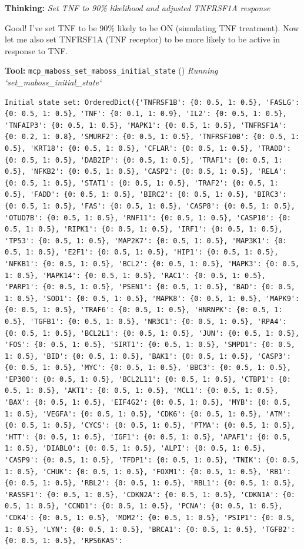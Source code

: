 \documentclass[11pt,a4paper]{article}
\begin{document}
\begin{thinkbox}
\textbf{Thinking:} \textit{Set TNF to 90\% likelihood and adjusted TNFRSF1A response}

Good! I've set TNF to be 90\% likely to be ON (simulating TNF treatment). Now let me also set TNFRSF1A (TNF receptor) to be more likely to be active in response to TNF.

\end{thinkbox}
\begin{toolokbox}
\textbf{Tool:} \texttt{mcp\_maboss\_set\_maboss\_initial\_state} (\checkmark)
\textit{Running `set\_maboss\_initial\_state`}
\begin{lstlisting}
Initial state set: OrderedDict({'TNFRSF1B': {0: 0.5, 1: 0.5}, 'FASLG': {0: 0.5, 1: 0.5}, 'TNF': {0: 0.1, 1: 0.9}, 'IL2': {0: 0.5, 1: 0.5}, 'TNFAIP3': {0: 0.5, 1: 0.5}, 'MAPK1': {0: 0.5, 1: 0.5}, 'TNFRSF1A': {0: 0.2, 1: 0.8}, 'SMURF2': {0: 0.5, 1: 0.5}, 'TNFRSF10B': {0: 0.5, 1: 0.5}, 'KRT18': {0: 0.5, 1: 0.5}, 'CFLAR': {0: 0.5, 1: 0.5}, 'TRADD': {0: 0.5, 1: 0.5}, 'DAB2IP': {0: 0.5, 1: 0.5}, 'TRAF1': {0: 0.5, 1: 0.5}, 'NFKB2': {0: 0.5, 1: 0.5}, 'CASP2': {0: 0.5, 1: 0.5}, 'RELA': {0: 0.5, 1: 0.5}, 'STAT1': {0: 0.5, 1: 0.5}, 'TRAF2': {0: 0.5, 1: 0.5}, 'FADD': {0: 0.5, 1: 0.5}, 'BIRC2': {0: 0.5, 1: 0.5}, 'BIRC3': {0: 0.5, 1: 0.5}, 'FAS': {0: 0.5, 1: 0.5}, 'CASP8': {0: 0.5, 1: 0.5}, 'OTUD7B': {0: 0.5, 1: 0.5}, 'RNF11': {0: 0.5, 1: 0.5}, 'CASP10': {0: 0.5, 1: 0.5}, 'RIPK1': {0: 0.5, 1: 0.5}, 'IRF1': {0: 0.5, 1: 0.5}, 'TP53': {0: 0.5, 1: 0.5}, 'MAP2K7': {0: 0.5, 1: 0.5}, 'MAP3K1': {0: 0.5, 1: 0.5}, 'E2F1': {0: 0.5, 1: 0.5}, 'HIP1': {0: 0.5, 1: 0.5}, 'NFKB1': {0: 0.5, 1: 0.5}, 'BCL2': {0: 0.5, 1: 0.5}, 'MAPK3': {0: 0.5, 1: 0.5}, 'MAPK14': {0: 0.5, 1: 0.5}, 'RAC1': {0: 0.5, 1: 0.5}, 'PARP1': {0: 0.5, 1: 0.5}, 'PSEN1': {0: 0.5, 1: 0.5}, 'BAD': {0: 0.5, 1: 0.5}, 'SOD1': {0: 0.5, 1: 0.5}, 'MAPK8': {0: 0.5, 1: 0.5}, 'MAPK9': {0: 0.5, 1: 0.5}, 'TRAF6': {0: 0.5, 1: 0.5}, 'HNRNPK': {0: 0.5, 1: 0.5}, 'TGFB1': {0: 0.5, 1: 0.5}, 'NR3C1': {0: 0.5, 1: 0.5}, 'RPA4': {0: 0.5, 1: 0.5}, 'BCL2L1': {0: 0.5, 1: 0.5}, 'JUN': {0: 0.5, 1: 0.5}, 'FOS': {0: 0.5, 1: 0.5}, 'SIRT1': {0: 0.5, 1: 0.5}, 'SMPD1': {0: 0.5, 1: 0.5}, 'BID': {0: 0.5, 1: 0.5}, 'BAK1': {0: 0.5, 1: 0.5}, 'CASP3': {0: 0.5, 1: 0.5}, 'MYC': {0: 0.5, 1: 0.5}, 'BBC3': {0: 0.5, 1: 0.5}, 'EP300': {0: 0.5, 1: 0.5}, 'BCL2L11': {0: 0.5, 1: 0.5}, 'CTBP1': {0: 0.5, 1: 0.5}, 'AKT1': {0: 0.5, 1: 0.5}, 'MCL1': {0: 0.5, 1: 0.5}, 'BAX': {0: 0.5, 1: 0.5}, 'EIF4G2': {0: 0.5, 1: 0.5}, 'MYB': {0: 0.5, 1: 0.5}, 'VEGFA': {0: 0.5, 1: 0.5}, 'CDK6': {0: 0.5, 1: 0.5}, 'ATM': {0: 0.5, 1: 0.5}, 'CYCS': {0: 0.5, 1: 0.5}, 'PTMA': {0: 0.5, 1: 0.5}, 'HTT': {0: 0.5, 1: 0.5}, 'IGF1': {0: 0.5, 1: 0.5}, 'APAF1': {0: 0.5, 1: 0.5}, 'DIABLO': {0: 0.5, 1: 0.5}, 'ALPI': {0: 0.5, 1: 0.5}, 'CASP9': {0: 0.5, 1: 0.5}, 'TFDP1': {0: 0.5, 1: 0.5}, 'TNIK': {0: 0.5, 1: 0.5}, 'CHUK': {0: 0.5, 1: 0.5}, 'FOXM1': {0: 0.5, 1: 0.5}, 'RB1': {0: 0.5, 1: 0.5}, 'RBL2': {0: 0.5, 1: 0.5}, 'RBL1': {0: 0.5, 1: 0.5}, 'RASSF1': {0: 0.5, 1: 0.5}, 'CDKN2A': {0: 0.5, 1: 0.5}, 'CDKN1A': {0: 0.5, 1: 0.5}, 'CCND1': {0: 0.5, 1: 0.5}, 'PCNA': {0: 0.5, 1: 0.5}, 'CDK4': {0: 0.5, 1: 0.5}, 'MDM2': {0: 0.5, 1: 0.5}, 'PSIP1': {0: 0.5, 1: 0.5}, 'LYN': {0: 0.5, 1: 0.5}, 'BRCA1': {0: 0.5, 1: 0.5}, 'TGFB2': {0: 0.5, 1: 0.5}, 'RPS6KA5': 
\end{lstlisting}
\end{toolokbox}
\end{document}
